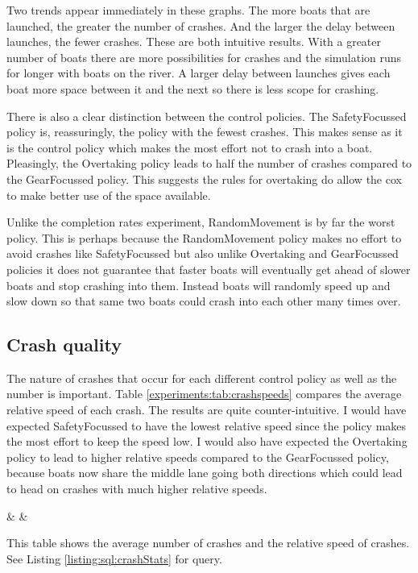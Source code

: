   Two trends appear immediately in these graphs. The more boats that are launched, the greater the number of crashes. And the larger the delay between launches, the fewer crashes. These are both intuitive results. With a greater number of boats there are more possibilities for crashes and the simulation runs for longer with boats on the river. A larger delay between launches gives each boat more space between it and the next so there is less scope for crashing.
  
  There is also a clear distinction between the control policies. The SafetyFocussed policy is, reassuringly, the policy with the fewest crashes. This makes sense as it is the control policy which makes the most effort not to crash into a boat. Pleasingly, the Overtaking policy leads to half the number of crashes compared to the GearFocussed policy. This suggests the rules for overtaking do allow the cox to make better use of the space available. 
  
  Unlike the completion rates experiment, RandomMovement is by far the worst policy. This is perhaps because the RandomMovement policy makes no effort to avoid crashes like SafetyFocussed but also unlike Overtaking and GearFocussed policies it does not guarantee that faster boats will eventually get ahead of slower boats and stop crashing into them. Instead boats will randomly speed up and slow down so that same two boats could crash into each other many times over.

  \subsection{Crash quality}
  The nature of crashes that occur for each different control policy as well as the number is important. Table \ref{experiments:tab:crashspeeds} compares the average relative speed of each crash. The results are quite counter-intuitive. I would have expected SafetyFocussed to have the lowest relative speed since the policy makes the most effort to keep the speed low. I would also have expected the Overtaking policy to lead to higher relative speeds compared to the GearFocussed policy, because boats now share the middle lane going both directions which could lead to head on crashes with much higher relative speeds.
  
  \begin{table}[h]
  \centering
  {\cp & \crashes & \speed}
  \caption{This table shows the average number of crashes and the relative speed of crashes. See Listing \ref{listing:sql:crashStats} for query.}
  \label{experiments:tab:crashspeeds}
  \end{table}
  
